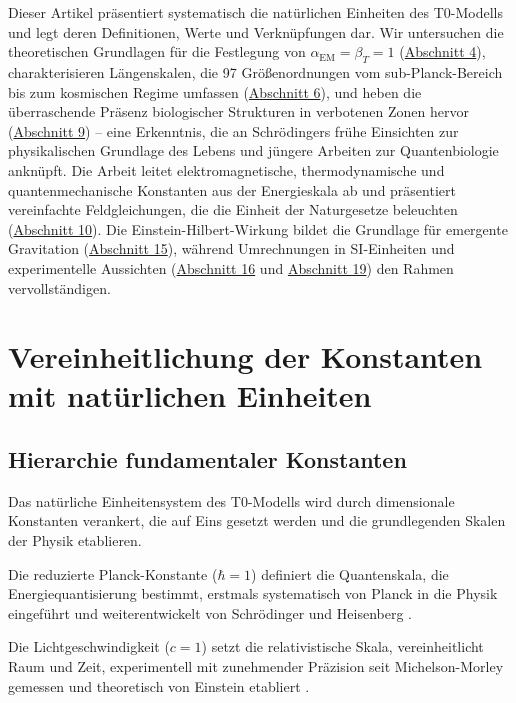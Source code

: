 \documentclass[twocolumn,aps,prl]{revtex4-2}
\begin{document}
	Dieser Artikel präsentiert systematisch die natürlichen Einheiten des T0-Modells und legt deren Definitionen, Werte und Verknüpfungen dar. Wir untersuchen die theoretischen Grundlagen für die Festlegung von $\alpha_{\text{EM}} = \beta_T = 1$ (\hyperref[subsec:beta_derivation]{Abschnitt 4}), charakterisieren Längenskalen, die 97 Größenordnungen vom sub-Planck-Bereich bis zum kosmischen Regime umfassen (\hyperref[sec:length_scales]{Abschnitt 6}), und heben die überraschende Präsenz biologischer Strukturen in verbotenen Zonen hervor (\hyperref[subsec:bio_anomalies]{Abschnitt 9}) – eine Erkenntnis, die an Schrödingers frühe Einsichten zur physikalischen Grundlage des Lebens \cite{Schrodinger1944} und jüngere Arbeiten zur Quantenbiologie \cite{McFadden2014} anknüpft. Die Arbeit leitet elektromagnetische, thermodynamische und quantenmechanische Konstanten aus der Energieskala ab und präsentiert vereinfachte Feldgleichungen, die die Einheit der Naturgesetze beleuchten (\hyperref[sec:field_equations]{Abschnitt 10}). Die Einstein-Hilbert-Wirkung bildet die Grundlage für emergente Gravitation (\hyperref[subsec:gravitation]{Abschnitt 15}), während Umrechnungen in SI-Einheiten und experimentelle Aussichten (\hyperref[sec:conversions]{Abschnitt 16} und \hyperref[sec:outlook]{Abschnitt 19}) den Rahmen vervollständigen.
	
	\section{Vereinheitlichung der Konstanten mit natürlichen Einheiten}
	\label{sec:hierarchy}
	
	\subsection{Hierarchie fundamentaler Konstanten}
	\label{subsec:level1}
	
	Das natürliche Einheitensystem des T0-Modells wird durch dimensionale Konstanten verankert, die auf Eins gesetzt werden und die grundlegenden Skalen der Physik etablieren.
	
	Die reduzierte Planck-Konstante ($\hbar = 1$) definiert die Quantenskala, die Energiequantisierung bestimmt, erstmals systematisch von Planck in die Physik eingeführt \cite{Planck1901} und weiterentwickelt von Schrödinger \cite{Schrodinger1926b} und Heisenberg \cite{Heisenberg1925}.
	
	Die Lichtgeschwindigkeit ($c = 1$) setzt die relativistische Skala, vereinheitlicht Raum und Zeit, experimentell mit zunehmender Präzision seit Michelson-Morley gemessen \cite{Michelson1887} und theoretisch von Einstein etabliert \cite{Einstein1905}.
	
\end{document}
